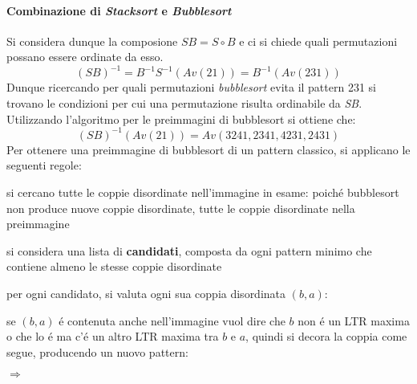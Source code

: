 \paragraph*{Combinazione di \textit{Stacksort} e \textit{Bubblesort}} Si considera dunque la composione $SB = S\circ{B}$ e ci si chiede quali permutazioni possano essere ordinate da esso.$$(SB)^{-1}=B^{-1}S^{-1}(Av(21))=B^{-1}(Av(231))$$
Dunque ricercando per quali permutazioni \textit{bubblesort} evita il pattern 231 si trovano le condizioni per cui una permutazione risulta ordinabile da \textit{SB}.\\
Utilizzando l'algoritmo per le preimmagini di bubblesort\cite{albert2010inverse} si ottiene che:$$(SB)^{-1}(Av(21))=Av(3241, 2341, 4231, 2431)$$
Per ottenere una preimmagine di bubblesort di un pattern classico, si applicano le seguenti regole:
\begin{description}
	\item si cercano tutte le coppie disordinate nell'immagine in esame: poich\'e bubblesort non produce nuove coppie disordinate, tutte le coppie disordinate nella preimmagine
	\item si considera una lista di \textbf{candidati}, composta da ogni pattern minimo che contiene almeno le stesse coppie disordinate 
	\item per ogni candidato, si valuta ogni sua coppia disordinata $(b,a)$:
	\item se $(b,a)$ \'e contenuta anche nell'immagine vuol dire che $b$ non \'e un LTR maxima o che lo \'e ma c'\'e un altro LTR maxima tra $b$ e $a$, quindi si decora la coppia come segue, producendo un nuovo pattern:
	\begin{center}
		$\Rightarrow$
	\end{center}
\end{description}
